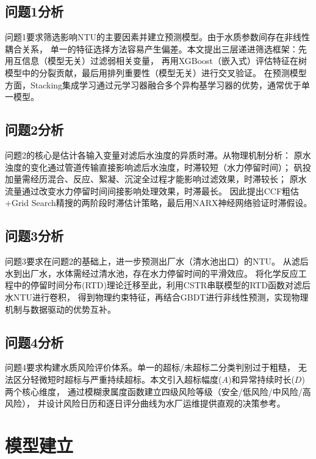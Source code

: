 \documentclass[12pt,a4paper]{ctexart}
\begin{document}
\subsection{问题1分析}

问题1要求筛选影响NTU的主要因素并建立预测模型。由于水质参数间存在非线性耦合关系，
单一的特征选择方法容易产生偏差。本文提出三层递进筛选框架：先用互信息（模型无关）过滤弱相关变量，
再用XGBoost（嵌入式）评估特征在树模型中的分裂贡献，最后用排列重要性（模型无关）进行交叉验证。
在预测模型方面，Stacking集成学习通过元学习器融合多个异构基学习器的优势，通常优于单一模型。

\subsection{问题2分析}

问题2的核心是估计各输入变量对滤后水浊度的异质时滞。从物理机制分析：
原水浊度的变化通过管道传输直接影响滤后水浊度，时滞较短（水力停留时间）；
矾投加量需经历混合、反应、絮凝、沉淀全过程才能影响过滤效果，时滞较长；
原水流量通过改变水力停留时间间接影响处理效果，时滞最长。
因此提出CCF粗估+Grid Search精搜的两阶段时滞估计策略，最后用NARX神经网络验证时滞假设。

\subsection{问题3分析}

问题3要求在问题2的基础上，进一步预测出厂水（清水池出口）的NTU。
从滤后水到出厂水，水体需经过清水池，存在水力停留时间的平滑效应。
将化学反应工程中的停留时间分布(RTD)理论迁移至此，利用CSTR串联模型的RTD函数对滤后水NTU进行卷积，
得到物理约束特征，再结合GBDT进行非线性预测，实现物理机制与数据驱动的优势互补。

\subsection{问题4分析}

问题4要求构建水质风险评价体系。单一的超标/未超标二分类判别过于粗糙，
无法区分轻微短时超标与严重持续超标。本文引入超标幅度($A$)和异常持续时长($D$)两个核心维度，
通过模糊隶属度函数建立四级风险等级（安全/低风险/中风险/高风险），
并设计风险日历和逐日评分曲线为水厂运维提供直观的决策参考。

\section{模型建立}
\end{document}
